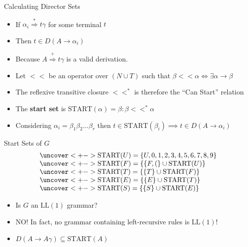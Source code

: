 \documentclass[]{beamer}
\begin{document}
\begin{frame}{Calculating Director Sets}
  \begin{itemize}[<+->]
      \item If $\alpha_i \stackrel{*}{\Rightarrow} t \gamma$ for some terminal $t$
      \item Then $t \in D(A \rightarrow \alpha_i)$
      \item Because $A \stackrel{+}{\Rightarrow} t \gamma$ is a valid derivation.
      \item Let $<<$ be an operator over $(N \cup T)$ such that $\beta << \alpha \iff \exists \alpha \rightarrow \beta$
      \item The reflexive transitive closure $<<^*$ is therefore the ``Can Start'' relation
      \item The \textbf{start set} is $\mathrm{START}(\alpha) = \beta : \beta <<^* \alpha$ 
      \item Considering $\alpha_i = \beta_1\beta_2\ldots\beta_r$ then $t \in \mathrm{START}(\beta_i) \implies t \in D(A \rightarrow \alpha_i)$
  \end{itemize}
\end{frame}

\begin{frame}{Start Sets of $G$}
  \[
    \begin{array}{l}
      \uncover<+->{\mathrm{START}(U) = \{U,0,1,2,3,4,5,6,7,8,9\}}\\
      \uncover<+->{\mathrm{START}(F) = \{\{F,(\} \cup \mathrm{START}(U)\}}\\
      \uncover<+->{\mathrm{START}(T) = \{\{T\} \cup \mathrm{START}(F)\}}\\
      \uncover<+->{\mathrm{START}(E) = \{\{E\} \cup \mathrm{START}(T)\}}\\
      \uncover<+->{\mathrm{START}(S) = \{\{S\} \cup \mathrm{START}(E)\}}\\
    \end{array}
  \]
  \begin{itemize}[<+->]
    \item Is $G$ an $\mathrm{LL(1)}$ grammar?
    \item NO!  In fact, no grammar containing left-recursive rules is $\mathrm{LL}(1)$!
    \item $D(A \rightarrow A \gamma) \subseteq \mathrm{START}(A)$
  \end{itemize}
\end{frame}
\end{document}
